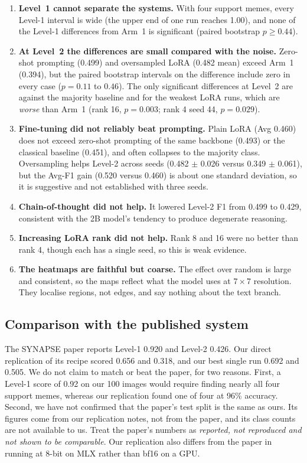 \begin{enumerate}
    \item \textbf{Level~1 cannot separate the systems.} With four support memes, every Level-1 interval is wide (the upper end of one run reaches 1.00), and none of the Level-1 differences from Arm~1 is significant (paired bootstrap $p\ge0.44$).
    \item \textbf{At Level~2 the differences are small compared with the noise.} Zero-shot prompting (0.499) and oversampled LoRA (0.482 mean) exceed Arm~1 (0.394), but the paired bootstrap intervals on the difference include zero in every case ($p=0.11$ to $0.46$). The only significant differences at Level~2 are against the majority baseline and for the weakest LoRA runs, which are \emph{worse} than Arm~1 (rank 16, $p=0.003$; rank 4 seed 44, $p=0.029$).
    \item \textbf{Fine-tuning did not reliably beat prompting.} Plain LoRA (Avg 0.460) does not exceed zero-shot prompting of the same backbone (0.493) or the classical baseline (0.451), and often collapses to the majority class. Oversampling helps Level-2 across seeds (0.482 $\pm$ 0.026 versus 0.349 $\pm$ 0.061), but the Avg-F1 gain (0.520 versus 0.460) is about one standard deviation, so it is suggestive and not established with three seeds.
    \item \textbf{Chain-of-thought did not help.} It lowered Level-2 F1 from 0.499 to 0.429, consistent with the 2B model's tendency to produce degenerate reasoning.
    \item \textbf{Increasing LoRA rank did not help.} Rank 8 and 16 were no better than rank 4, though each has a single seed, so this is weak evidence.
    \item \textbf{The heatmaps are faithful but coarse.} The effect over random is large and consistent, so the maps reflect what the model uses at $7\times7$ resolution. They localise regions, not edges, and say nothing about the text branch.
\end{enumerate}

\subsection{Comparison with the published system}
\label{sec:paper-gap}

The SYNAPSE paper reports Level-1 0.920 and Level-2 0.426. Our direct replication of its recipe scored 0.656 and 0.318, and our best single run 0.692 and 0.505. We do not claim to match or beat the paper, for two reasons. First, a Level-1 score of 0.92 on our 100 images would require finding nearly all four support memes, whereas our replication found one of four at 96\% accuracy. Second, we have not confirmed that the paper's test split is the same as ours. Its figures come from our replication notes, not from the paper, and its class counts are not available to us. Treat the paper's numbers as \emph{reported, not reproduced and not shown to be comparable}. Our replication also differs from the paper in running at 8-bit on MLX rather than bf16 on a GPU.

